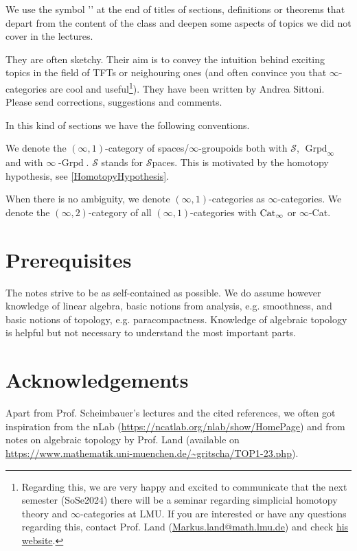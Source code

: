 \begin{notat}[\extra]
    We use the symbol '\extra' at the end of titles of sections, definitions or theorems that depart from the
    content of the class and deepen some aspects of topics we did not cover in the lectures.
    
    They are often sketchy. Their aim is to convey the intuition behind exciting topics in the field of TFTs
     or neighouring ones (and often
    convince you that $\infty$-categories are cool and useful\footnote{Regarding this, we are very 
    happy and excited to communicate that the next semester (SoSe2024) there will be a seminar
    regarding simplicial homotopy theory and $\infty$-categories at LMU. If you are interested or 
    have any questions regarding this, contact Prof. Land
     (\href{mailto:Markus.land@math.lmu.de}{Markus.land@math.lmu.de}) and check
     \href{https://www.markus-land.de}{his website}.}). They have been written by Andrea Sittoni.
    Please send corrections, suggestions and comments.
\end{notat}
In this kind of sections we have the following conventions.
\begin{notat}
We denote the $(\infty,1)$-category of spaces/$\infty$-groupoids both with $\mathscr{S}$,
 $\operatorname{Grpd}_\infty$ and with $\infty\operatorname{-Grpd}$. $\mathscr{S}$ stands for 
 $\mathscr{S}$paces. This is motivated by the
  homotopy hypothesis, see \ref{HomotopyHypothesis}.
\end{notat}
\begin{notat}
When there is no ambiguity, we denote $(\infty,1)$-categories as $\infty$-categories. We denote the
$(\infty,2)$-category of all $(\infty,1)$-categories with $\operatorname{Cat}_\infty$ or $\infty$-Cat.
\end{notat}
\section*{Prerequisites}
The notes strive to be as self-contained as possible. We do assume however knowledge of linear algebra,
basic notions from analysis, e.g. smoothness, and basic notions of topology, e.g. 
paracompactness. Knowledge of algebraic topology is helpful but not necessary to understand the
most important parts.
\section*{Acknowledgements}
Apart from Prof. Scheimbauer's lectures and the cited references,
we often got inspiration from the nLab (\url{https://ncatlab.org/nlab/show/HomePage}) and from notes
on algebraic topology by Prof. Land (available on \url{https://www.mathematik.uni-muenchen.de/~gritscha/TOP1-23.php}).

\thispagestyle{empty}
\hfill
\vspace{0.50cm}
\textcolor{black}{\tableofcontents}